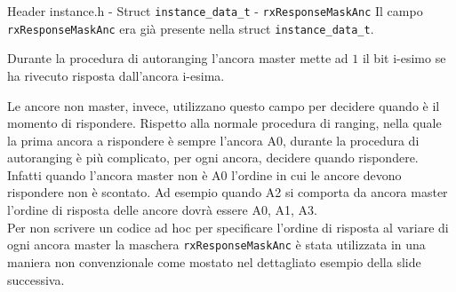\begin{frame}[shrink=10]{Header instance.h - Struct \lstinline[language=C]!instance_data_t! - \lstinline[language=C]!rxResponseMaskAnc!}
  Il campo \lstinline[language=C]!rxResponseMaskAnc! era già presente nella struct \lstinline[language=C]!instance_data_t!.
  \par
  Durante la procedura di autoranging l'ancora master mette ad $1$ il bit i-esimo se ha rivecuto risposta dall'ancora i-esima.
  \par
  Le ancore \alert{non} master, invece, utilizzano questo campo per decidere quando è il momento di rispondere.
  Rispetto alla normale procedura di ranging, nella quale la prima ancora a rispondere è sempre l'ancora A0, durante la
  procedura di autoranging è più complicato, per ogni ancora, decidere quando rispondere. Infatti quando l'ancora master non è A0
  l'ordine in cui le ancore devono rispondere non è scontato. Ad esempio quando A2 si comporta da ancora master l'ordine di risposta delle ancore
  dovrà essere A0, A1, A3.\\
  Per non scrivere un codice ad hoc per specificare l'ordine di risposta al variare di ogni ancora master la maschera \lstinline[language=C]!rxResponseMaskAnc!
  è stata utilizzata in una maniera non convenzionale come mostato nel dettagliato esempio della slide successiva.
\end{frame}

